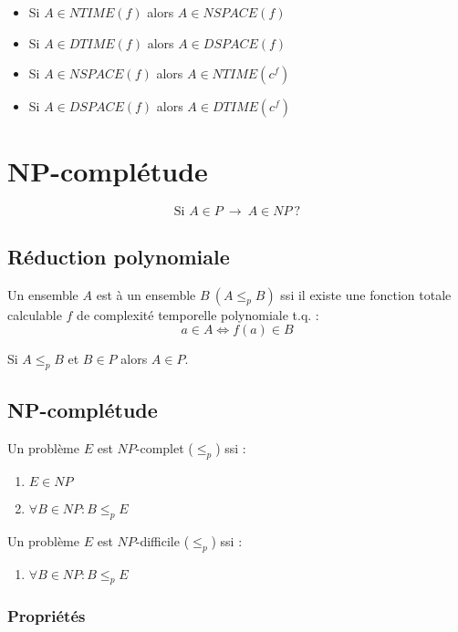 \begin{itemize}
\item Si $A \in NTIME(f)$ alors $A \in NSPACE(f)$
\item Si $A \in DTIME(f)$ alors $A \in DSPACE(f)$
\item Si $A \in NSPACE(f)$ alors $A \in NTIME(c^f)$
\item Si $A \in DSPACE(f)$ alors $A \in DTIME(c^f)$
\end{itemize}

\section{NP-complétude}

\begin{equation*}
\text{Si } A \in P\ \rightarrow\ A \in NP\ ?
\end{equation*}

\subsection{Réduction polynomiale}

Un ensemble $A$ est  à un ensemble $B \ (A \leq_p B)$ ssi il existe une fonction totale calculable $f$ de complexité temporelle polynomiale t.q. :
\begin{equation*}
a \in A \Leftrightarrow f(a) \in B
\end{equation*}

Si $A \leq_p B$ et $B \in P$ alors $A \in P$.

\subsection{NP-complétude}

Un problème $E$ est $NP$-complet ($\leq_p$) ssi :
\begin{enumerate}
\item $E \in NP$
\item $\forall B \in NP : B \leq_p E$
\end{enumerate}
Un problème $E$ est $NP$-difficile ($\leq_p$) ssi :
\begin{enumerate}
\item $\forall B \in NP : B \leq_p E$
\end{enumerate}

\subsubsection{Propriétés}

